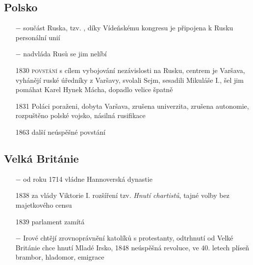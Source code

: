 \documentclass{article}
\begin{document}
\subsection*{Polsko}
\begin{itemize}
    \vspace{-0.5em}
    \setlength\itemsep{0.15em}
    \item[$-$] součást Ruska, tzv. , díky Vídeňskému kongresu je připojena k Rusku personální unií
    \item[$-$] nadvláda Rusů se jim nelíbí
    \item[1830] \textsc{povstání} s cílem vybojování nezávislosti na Rusku, centrem je Varšava, vyhánějí ruské úředníky z Varšavy, svolali Sejm, sesadili Mikuláše I., šel jim pomáhat Karel Hynek Mácha, dopadlo velice špatně
    \item[1831] Poláci poraženi, dobyta Varšava, zrušena univerzita, zrušena autonomie, rozpuštěno polské vojsko, násilná rusifikace
    \item[1863] další neúspěšné povstání
\end{itemize}


\subsection*{Velká Británie}
\begin{itemize}
    \vspace{-0.5em}
    \setlength\itemsep{0.15em}
    \item[$-$] od roku 1714 vládne Hannoverská dynastie
    \item[1838] za vlády Viktorie I. rozšíření tzv. \textit{Hnutí chartistů}, tajné volby bez majetkového censu
    \item[1839] parlament zamítá
    \item[$-$] Irové chtějí zrovnoprávnění katolíků s protestanty, odtrhnutí od Velké Británie chce hnutí Mladé Irsko, 1848 neúspěšná revoluce, ve 40. letech plíseň brambor, hladomor, emigrace
\end{itemize}
\end{document}
